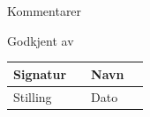 \documentclass[12pt]{article}
\begin{document}
\begin{reportSection}{Kommentarer}
\vspace{20mm}



\end{reportSection}
\vspace{1mm}




\begin{reportSection}{Godkjent av}
\vspace{1mm}
\tabulinesep=5pt
\noindent 
{}
\noindent \begin{tabu} to \textwidth {|XU||XU|}
\hline
Signatur  &   & Navn  &   \\ \hline
Stilling   &   & Dato    &        \\ \hline
\end{tabu}

\end{reportSection}
\end{document}
